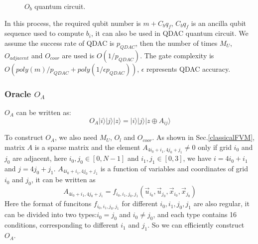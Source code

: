 \documentclass[%
 reprint,
 amsmath,amssymb,
pra,
]{revtex4-1}
\begin{document}
\begin{itemize}
\begin{figure}[htbp]
    \caption{$O_b$ quantum circuit. }
    \label{OB}
\end{figure}

In this process, the required qubit number is $m+C_bq_f$, $C_bq_f$ is an ancilla qubit sequence used to compute $b_i$, it can also be used in QDAC quantum circuit. We assume the success rate of QDAC is $p_{QDAC}$, then the number of times $M_U$, $O_{adjacent}$ and $O_{coor}$ are used is $O(1/p_{QDAC})$. The gate complexity is $O(poly(m)/p_{QDAC}+poly(1/\epsilon p_{QDAC}))$, $\epsilon$ represents QDAC accuracy.


\subsubsection{Oracle $O_A$}
$O_A$ can be written as:
$$
O_A|i\rangle|j\rangle|z\rangle=|i\rangle|j\rangle|z\oplus A_{ij}\rangle
$$

To construct $O_A$, we also need $M_U$, $O_l$ and $O_{coor}$. As shown in Sec.\ref{classicalFVM}, matrix $A$ is a sparse matrix and the element $A_{4i_0+i_1,4j_0+j_1}\neq0$ only if grid $i_0$ and $j_0$ are adjacent, here $i_0,j_0\in[0,N-1]$ and $i_1,j_1\in[0,3]$, we have $i=4i_0+i_1$ and $j=4j_0+j_1$. $A_{4i_0+i_1,4j_0+j_1}$ is a function of variables and coordinates of grid $i_0$ and $j_0$, it can be written as
$$
A_{4i_0+i_1,4j_0+j_1}=f_{i_0,i_1,j_0,j_1}(\vec{u}_{i_0},\vec{u}_{j_0},\vec{x}_{i_0},\vec{x}_{j_0})
$$
Here the format of funcitons $f_{i_0,i_1,j_0,j_1}$ for different $i_0,i_1,j_0,j_1$ are also regular, it can be divided into two types:$i_0=j_0$ and $i_0\neq j_0$, and each type contains 16 conditions, corresponding to different $i_1$ and $j_1$. So we can efficiently construct $O_A$.


\end{itemize}
\end{document}
